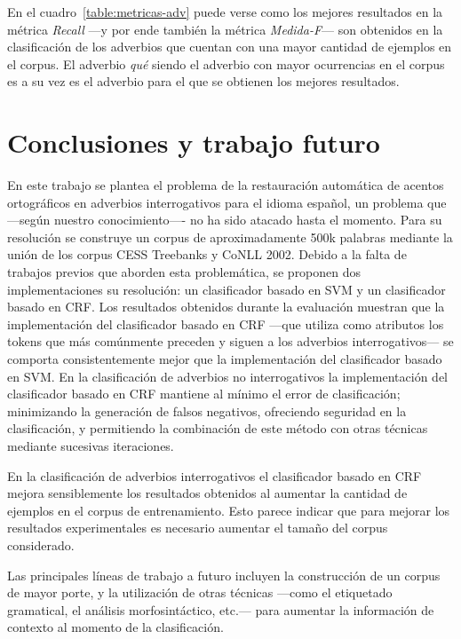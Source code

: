 \documentclass[runningheads,a4paper]{llncs}
\begin{document}
En el cuadro~\ref{table:metricas-adv} puede verse como los mejores resultados en la métrica \emph{Recall} ---y por ende también la métrica \emph{Medida-F}--- son obtenidos en la clasificación de los adverbios que cuentan con una mayor cantidad de ejemplos en el corpus. El adverbio \emph{qué} siendo el adverbio con mayor ocurrencias en el corpus es a su vez es el adverbio para el que se obtienen los mejores resultados. 

\section{Conclusiones y trabajo futuro}
\label{sec:Conclusiones}

En este trabajo se plantea el problema de la restauración automática de acentos ortográficos en adverbios interrogativos para el idioma español, un problema que ---según nuestro conocimiento---- no ha sido atacado hasta el momento. Para su resolución se construye un corpus de aproximadamente 500k palabras mediante la unión de los corpus CESS Treebanks y CoNLL 2002. Debido a la falta de trabajos previos que aborden esta problemática, se proponen dos implementaciones su resolución: un clasificador basado en SVM y un clasificador basado en CRF. Los resultados obtenidos durante la evaluaci\'on muestran que la implementación del clasificador basado en CRF ---que utiliza como atributos los tokens que más comúnmente preceden y siguen a los adverbios interrogativos--- se comporta consistentemente mejor que la implementación del clasificador basado en SVM. 
\newpage
En la clasificaci\'on de adverbios no interrogativos la implementación del clasificador basado en CRF mantiene al m\'inimo el error de clasificaci\'on; minimizando la generaci\'on de falsos negativos, ofreciendo seguridad en la clasificaci\'on, y permitiendo la combinaci\'on de este método con otras t\'ecnicas mediante sucesivas iteraciones. 

En la clasificación de adverbios interrogativos el clasificador basado en CRF mejora sensiblemente los resultados obtenidos al aumentar la cantidad de ejemplos en el corpus de entrenamiento. Esto parece indicar que para mejorar los resultados experimentales es necesario aumentar el tamaño del corpus considerado.

Las principales líneas de trabajo a futuro incluyen la construcción de un corpus de mayor porte, y la utilización de otras técnicas ---como el etiquetado gramatical, el análisis morfosintáctico, etc.--- para aumentar la información de contexto al momento de la clasificación.



\end{document}
